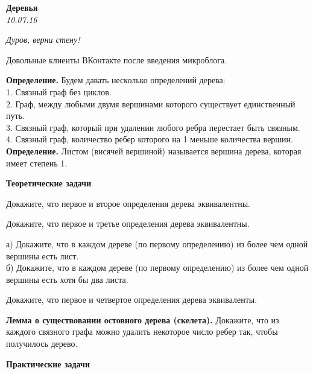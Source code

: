 \begin{center}
\textbf{\Large Деревья}\\
\textit{10.07.16}
\end{center}

\epigraph{\it Дуров, верни стену!}{Довольные клиенты ВКонтакте после введения микроблога.}

\textbf{Определение.} Будем давать несколько определений дерева:\\
1. Связный граф без циклов.\\
2. Граф, между любыми двумя вершинами которого существует единственный путь.\\
3. Связный граф, который при удалении любого ребра перестает быть связным.\\
4. Связный граф, количество ребер которого на 1 меньше количества вершин.\\
\textbf{Определение.} Листом (висячей вершиной) называется вершина дерева, которая имеет степень 1.\\
\begin{center}
\textbf{Теоретические задачи}\\
\end{center}
\begin{problems}
\item Докажите, что первое и второе определения дерева эквивалентны.
\item Докажите, что первое и третье определения дерева эквивалентны. 
\item а) Докажите, что в каждом дереве (по первому определению) из более чем одной вершины есть лист.\\
б) Докажите, что в каждом дереве (по первому определению) из более чем одной вершины есть хотя бы два листа.
\item Докажите, что первое и четвертое определения дерева эквиваленты.
\item \textbf{Лемма о существовании остовного дерева (скелета).} Докажите, что из каждого связного графа можно удалить некоторое число ребер так, чтобы получилось дерево. 

\end{problems}
\begin{center}
\textbf{Практические задачи}\\
\end{center}
\resetproblem

